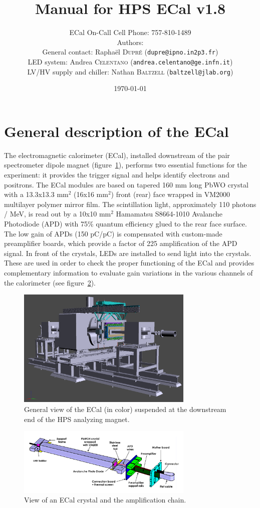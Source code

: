 \documentclass[12pt]{article}
\title{Manual for HPS ECal v1.8}
\author{ECal On-Call Cell Phone: 757-810-1489 \\ 
Authors: \\
General contact: Rapha\"el \textsc{Dupr\'e} (\texttt{dupre@ipno.in2p3.fr})\\ 
LED system: Andrea \textsc{Celentano} (\texttt{andrea.celentano@ge.infn.it})\\
LV/HV supply and chiller: Nathan \textsc{Baltzell} (\texttt{baltzell@jlab.org})\\
}
\date{\today} %
\begin{document}
\maketitle{}

   \section{General description of the ECal}


The electromagnetic calorimeter (ECal), installed downstream of the pair spectrometer dipole magnet (figure~\ref{GView}), performs two essential functions for the experiment: it provides the trigger signal and helps identify electrons and positrons. The ECal modules are based on tapered 160 mm long PbWO crystal with a 13.3x13.3 mm$^2$ (16x16 mm$^2$) front (rear) face wrapped in VM2000 multilayer polymer mirror film. The scintillation light, approximately 110 photons / MeV, is read out by a 10x10 mm$^2$ Hamamatsu S8664-1010 Avalanche Photodiode (APD) with 75\% quantum efficiency glued to the rear face surface. The low gain of APDs (150 pC/pC) is compensated with custom-made preamplifier boards, which provide a factor of 225 amplification of the APD signal. In front of the crystals, LEDs are installed to send light into the crystals. These are used in order to check the proper functioning of the ECal and provides complementary information to evaluate gain variations in the various channels of the calorimeter (see figure~\ref{AmplChain}).

\begin{figure}[hp]
\center
\includegraphics[width=0.75\textwidth]{pics/GView.png}
\caption{\small \label{GView} General view of the ECal (in color) suspended at the downstream end of the HPS analyzing magnet.}
\end{figure}

\begin{figure}[hp]
\center
\includegraphics[width=0.75\textwidth]{pics/CrystalAssembly.png}
\caption{\small \label{AmplChain} View of an ECal crystal and the amplification chain.}
\end{figure}
      
\end{document}

